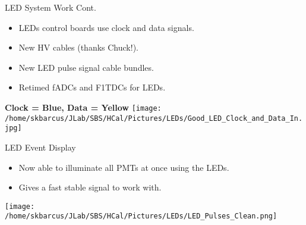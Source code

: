 \documentclass[10pt]{beamer}
\begin{document}
\begin{frame}{LED System Work Cont.}

    \begin{itemize}
    		\item LEDs control boards use clock and data signals.
        \item New HV cables (thanks Chuck!).
        \item New LED pulse signal cable bundles.
        \item Retimed fADCs and F1TDCs for LEDs.
    \end{itemize}

	
	\vspace{-2mm}
	\begin{center}
	    \textbf{Clock = Blue, Data = Yellow }
	    \texttt{[image: /home/skbarcus/JLab/SBS/HCal/Pictures/LEDs/Good\_LED\_Clock\_and\_Data\_In.jpg]}
  	\end{center}
	
%	
%	

\end{frame}

\begin{frame}{LED Event Display}

	\begin{itemize}
		\item Now able to illuminate all PMTs at once using the LEDs.
		\item Gives a fast stable signal to work with.
	\end{itemize}

	\begin{center}
		\texttt{[image: /home/skbarcus/JLab/SBS/HCal/Pictures/LEDs/LED\_Pulses\_Clean.png]}
  	\end{center}

\end{frame}
\end{document}
